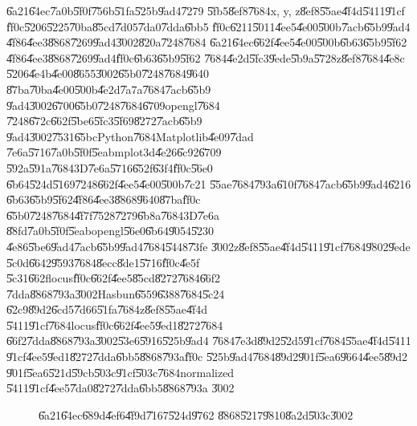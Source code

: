 \bigskip

\U{6a21}\U{64ec}\U{7a0b}\U{5f0f}\U{756b}\U{51fa}\U{525b}\U{9ad4}\U{7279}%
\U{5fb5}\U{8ef8}\U{7684}x, y, z\U{8ef8}\U{55ae}\U{4f4d}\U{5411}\U{91cf}%
\U{ff0c}\U{5206}\U{5225}\U{70ba}\U{85cd}\U{7d05}\U{7da0}\U{7dda}\U{6bb5}%
\U{ff0c}\U{6211}\U{5011}\U{4ee5}\U{4e00}\U{500b}\U{7acb}\U{65b9}\U{9ad4}%
\U{4f86}\U{4ee3}\U{8868}\U{7269}\U{9ad4}\U{3002}\U{820a}\U{7248}\U{7684}%
\U{6a21}\U{64ec}\U{662f}\U{4ee5}\U{4e00}\U{500b}\U{6b63}\U{65b9}\U{5f62}%
\U{4f86}\U{4ee3}\U{8868}\U{7269}\U{9ad4}\U{ff0c}\U{6b63}\U{65b9}\U{5f62}%
\U{7684}\U{4e2d}\U{5fc3}\U{9ede}\U{5b9a}\U{5728}z\U{8ef8}\U{7684}\U{4e8c}%
\U{5206}\U{4e4b}\U{4e00}\U{8655}\U{3002}\U{65b0}\U{7248}\U{7684}\U{9640}%
\U{87ba}\U{70ba}\U{4e00}\U{500b}\U{4e2d}\U{7a7a}\U{7684}\U{7acb}\U{65b9}%
\U{9ad4}\U{3002}\U{6700}\U{65b0}\U{7248}\U{7684}\U{6709}opengl\U{7684}%
\U{7248}\U{672c}\U{662f}\U{5be6}\U{5fc3}\U{5f69}\U{8272}\U{7acb}\U{65b9}%
\U{9ad4}\U{3002}\U{7531}\U{65bc}Python\U{7684}Matplotlib\U{4e09}\U{7dad}%
\U{7e6a}\U{5716}\U{7a0b}\U{5f0f}\U{5eab}mplot3d\U{4e26}\U{6c92}\U{6709}%
\U{592a}\U{591a}\U{7684}3D\U{7e6a}\U{5716}\U{652f}\U{63f4}\U{ff0c}\U{56e0}%
\U{6b64}\U{524d}\U{5169}\U{7248}\U{662f}\U{4ee5}\U{4e00}\U{500b}\U{7c21}%
\U{55ae}\U{7684}\U{793a}\U{610f}\U{7684}\U{7acb}\U{65b9}\U{9ad4}\U{6216}%
\U{6b63}\U{65b9}\U{5f62}\U{4f86}\U{4ee3}\U{8868}\U{9640}\U{87ba}\U{ff0c}%
\U{65b0}\U{7248}\U{7684}\U{4f7f}\U{7528}\U{7279}\U{6b8a}\U{7684}3D\U{7e6a}%
\U{88fd}\U{7a0b}\U{5f0f}\U{5eab}opengl\U{56e0}\U{6b64}\U{9054}\U{5230}%
\U{4e86}\U{5be6}\U{9ad4}\U{7acb}\U{65b9}\U{9ad4}\U{7684}\U{5448}\U{73fe}%
\U{3002}z\U{8ef8}\U{55ae}\U{4f4d}\U{5411}\U{91cf}\U{7684}\U{9802}\U{9ede}%
\U{5c0d}\U{6642}\U{9593}\U{7684}\U{8ecc}\U{8de1}\U{5716}\U{ff0c}\U{4e5f}%
\U{5c31}\U{662f}locus\U{ff0c}\U{662f}\U{4ee5}\U{85cd}\U{8272}\U{7684}\U{66f2}%
\U{7dda}\U{8868}\U{793a}\U{3002}Hasbun\U{6559}\U{6388}\U{7684}\U{5c24}%
\U{62c9}\U{89d2}\U{6cd5}\U{7d66}\U{51fa}\U{7684}z\U{8ef8}\U{55ae}\U{4f4d}%
\U{5411}\U{91cf}\U{7684}locus\U{ff0c}\U{662f}\U{4ee5}\U{9ed1}\U{8272}\U{7684}%
\U{66f2}\U{7dda}\U{8868}\U{793a}\U{3002}\U{53e6}\U{5916}\U{525b}\U{9ad4}%
\U{7684}\U{7e3d}\U{89d2}\U{52d5}\U{91cf}\U{7684}\U{55ae}\U{4f4d}\U{5411}%
\U{91cf}\U{4ee5}\U{9ed1}\U{8272}\U{7dda}\U{6bb5}\U{8868}\U{793a}\U{ff0c}%
\U{525b}\U{9ad4}\U{7684}\U{89d2}\U{901f}\U{5ea6}\U{9664}\U{4ee5}\U{89d2}%
\U{901f}\U{5ea6}\U{521d}\U{59cb}\U{503c}\U{91cf}\U{503c}\U{7684}normalized%
\U{5411}\U{91cf}\U{4ee5}\U{7da0}\U{8272}\U{7dda}\U{6bb5}\U{8868}\U{793a}%
\U{3002}

\begin{figure}[th]
\caption{\U{6a21}\U{64ec}\U{689d}\U{4ef6}\U{4f9d}\U{7167}\U{524d}\U{9762}%
\U{8868}\U{5217}\U{9810}\U{8a2d}\U{503c}\U{3002}}
\begin{center}
\fbox{}
\end{center}
\end{figure}

